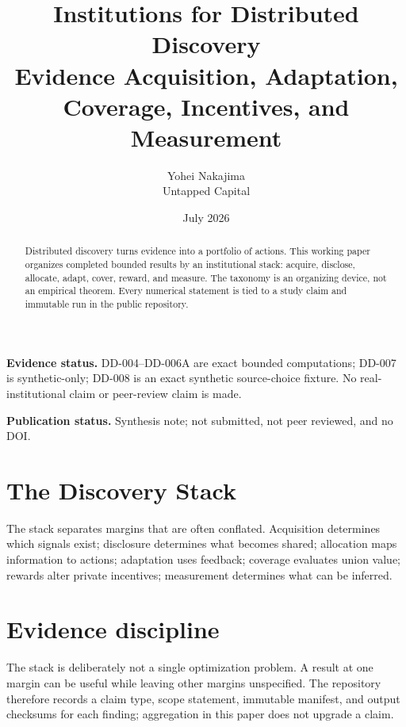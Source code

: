 \documentclass[11pt]{article}
\title{\textbf{Institutions for Distributed Discovery}\\[0.3em]\large Evidence Acquisition, Adaptation, Coverage, Incentives, and Measurement}
\author{Yohei Nakajima\\Untapped Capital}
\date{July 2026}
\begin{document}
\maketitle
\begin{abstract}
Distributed discovery turns evidence into a portfolio of actions. This working
paper organizes completed bounded results by an institutional stack: acquire,
disclose, allocate, adapt, cover, reward, and measure. The taxonomy is an
organizing device, not an empirical theorem. Every numerical statement is tied
to a study claim and immutable run in the public repository.
\end{abstract}
\noindent\textbf{Evidence status.} DD-004--DD-006A are exact bounded computations;
DD-007 is synthetic-only; DD-008 is an exact synthetic source-choice fixture.
No real-institutional claim or peer-review claim is made.
\par\noindent\textbf{Publication status.} Synthesis note; not submitted, not
peer reviewed, and no DOI.
\section{The Discovery Stack}
\begin{center}\end{center}
The stack separates margins that are often conflated. Acquisition determines
which signals exist; disclosure determines what becomes shared; allocation maps
information to actions; adaptation uses feedback; coverage evaluates union value;
rewards alter private incentives; measurement determines what can be inferred.

\section{Evidence discipline}
The stack is deliberately not a single optimization problem. A result at one
margin can be useful while leaving other margins unspecified. The repository
therefore records a claim type, scope statement, immutable manifest, and output
checksums for each finding; aggregation in this paper does not upgrade a claim.
\end{document}
